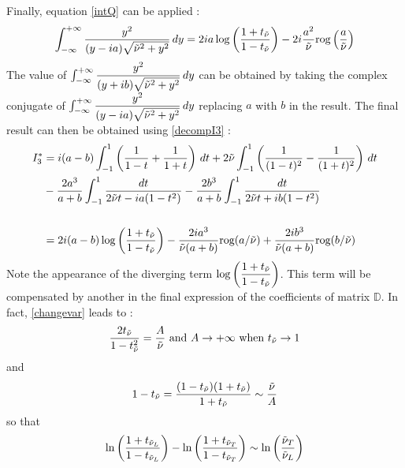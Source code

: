 Finally, equation \eqref{intQ} can be applied :
\begin{equation}
\int_{-\infty}^{+\infty} \frac{y^2}{(y-ia)\sqrt{\tilde{\nu}^2+y^2}} \, dy =2ia\log\left(\frac{1+t_{\tilde{\nu}}}{1-t_{\tilde{\nu}}}\right)-2i\frac{a^2}{\tilde{\nu}}\mbox{rog}\left(\frac{a}{\tilde{\nu}}\right)
\label{y2_D}
\end{equation}
The value of $\int_{-\infty}^{+\infty} \dfrac{y^2}{(y+ib)\sqrt{\tilde{\nu}^2+y^2}} \, dy $ can be obtained by taking the complex conjugate of  $\int_{-\infty}^{+\infty} \dfrac{y^2}{(y-ia)\sqrt{\tilde{\nu}^2+y^2}} \, dy $ replacing $a$ with $b$ in the result. The final result can then be obtained using \eqref{decompI3} :
\begin{equation}
\begin{split}
I_3^*&=i(a-b)\int_{-1}^1 \left( \frac{1}{1-t}+\frac{1}{1+t} \right) \, dt+ 2\tilde{\nu} \int_{-1}^1 \left( \frac{1}{(1-t)^2}-\frac{1}{(1+t)^2} \right) \, dt \\
 &-\frac{2a^3}{a+b}\int_{-1}^1\frac{dt}{2\tilde{\nu} t-ia(1-t^2)}-\frac{2b^3}{a+b}\int_{-1}^1\frac{dt}{2\tilde{\nu} t+ib(1-t^2)}\\
 ~\\
 &=2i(a-b)\log\left(\frac{1+t_{\tilde{\nu}}}{1-t_{\tilde{\nu}}}\right)-\frac{2ia^3}{\tilde{\nu}(a+b)}\mbox{rog}(a/\tilde{\nu})+\frac{2ib^3}{\tilde{\nu}(a+b)}\mbox{rog}(b/\tilde{\nu}) 
\end{split}
\label{valI3}
\end{equation}
Note the appearance of the diverging term $\log\left(\dfrac{1+t_{\tilde{\nu}}}{1-t_{\tilde{\nu}}}\right)$. This term will be compensated by another in the final expression of the coefficients of matrix $\mathbb{D}$. In fact, \eqref{changevar} leads to :
\begin{equation}
\frac{2t_{\tilde{\nu}}}{1-t_{\tilde{\nu}}^2}=\frac{A}{\tilde{\nu}} \mbox{ and } A\rightarrow + \infty \mbox{ when } t_{\tilde{\nu}} \rightarrow 1
\end{equation}
and
\begin{equation}
1-t_{\tilde{\nu}} =\frac{(1-t_{\tilde{\nu}})(1+t_{\tilde{\nu}})}{1+t_{\tilde{\nu}}} \sim \frac{\tilde{\nu}}{A}
\end{equation}
so that
\begin{equation}
\ln\left(\frac{1+t_{\tilde{\nu}_L}}{1-t_{\tilde{\nu}_L}}\right)- \ln\left(\frac{1+t_{\tilde{\nu}_T}}{1-t_{\tilde{\nu}_T}}\right)\sim \ln\left(\frac{\tilde{\nu}_T}{\tilde{\nu}_L}\right) 
\label{compensation}
\end{equation}
